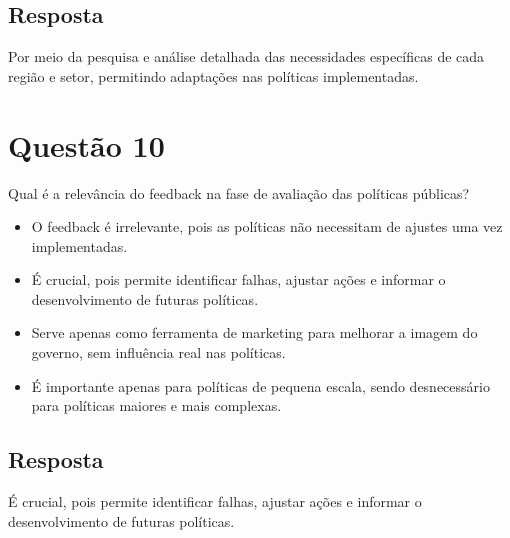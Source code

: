 \documentclass[
   article,       
   12pt,          
   oneside,       
   a4paper,       
   english,       
   brazil,        
   sumario=tradicional
   ]{abntex2}
\begin{document}
\subsection{Resposta}
Por meio da pesquisa e análise detalhada das necessidades específicas de cada região e setor, permitindo adaptações nas políticas implementadas.

\section{Questão 10}
Qual é a relevância do feedback na fase de avaliação das políticas públicas?

\begin{itemize}
  \item O feedback é irrelevante, pois as políticas não necessitam de ajustes uma vez implementadas.
  \item É crucial, pois permite identificar falhas, ajustar ações e informar o desenvolvimento de futuras políticas.
  \item Serve apenas como ferramenta de marketing para melhorar a imagem do governo, sem influência real nas políticas.
  \item É importante apenas para políticas de pequena escala, sendo desnecessário para políticas maiores e mais complexas.
\end{itemize}

\subsection{Resposta}
É crucial, pois permite identificar falhas, ajustar ações e informar o desenvolvimento de futuras políticas.
\postextual

\end{document}
